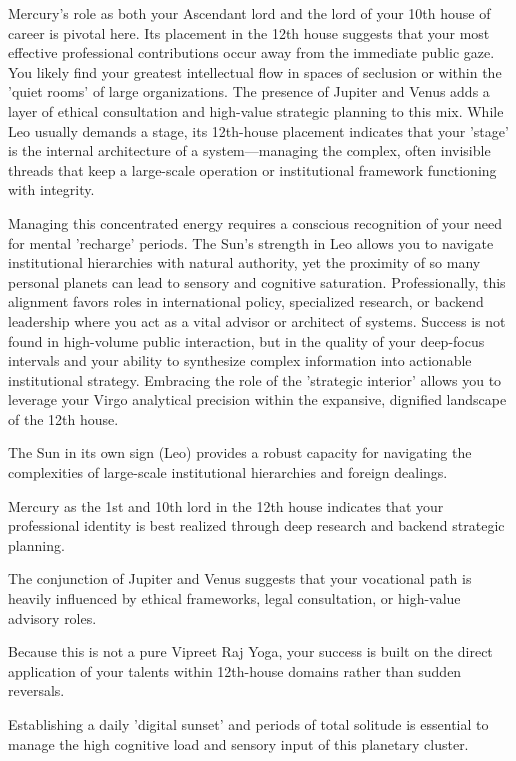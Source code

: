 {\fontsize{9}{13}\selectfont Mercury's role as both your Ascendant lord and the lord of your 10th house of career is pivotal here. Its placement in the 12th house suggests that your most effective professional contributions occur away from the immediate public gaze. You likely find your greatest intellectual flow in spaces of seclusion or within the 'quiet rooms' of large organizations. The presence of Jupiter and Venus adds a layer of ethical consultation and high-value strategic planning to this mix. While Leo usually demands a stage, its 12th-house placement indicates that your 'stage' is the internal architecture of a system---managing the complex, often invisible threads that keep a large-scale operation or institutional framework functioning with integrity.}\par\vspace{1.8mm}

{\fontsize{9}{13}\selectfont Managing this concentrated energy requires a conscious recognition of your need for mental 'recharge' periods. The Sun's strength in Leo allows you to navigate institutional hierarchies with natural authority, yet the proximity of so many personal planets can lead to sensory and cognitive saturation. Professionally, this alignment favors roles in international policy, specialized research, or backend leadership where you act as a vital advisor or architect of systems. Success is not found in high-volume public interaction, but in the quality of your deep-focus intervals and your ability to synthesize complex information into actionable institutional strategy. Embracing the role of the 'strategic interior' allows you to leverage your Virgo analytical precision within the expansive, dignified landscape of the 12th house.}\par\vspace{1.8mm}

\begin{diamondlist}
  \item {\fontsize{8.5}{12}\selectfont The Sun in its own sign (Leo) provides a robust capacity for navigating the complexities of large-scale institutional hierarchies and foreign dealings.}
  \item {\fontsize{8.5}{12}\selectfont Mercury as the 1st and 10th lord in the 12th house indicates that your professional identity is best realized through deep research and backend strategic planning.}
  \item {\fontsize{8.5}{12}\selectfont The conjunction of Jupiter and Venus suggests that your vocational path is heavily influenced by ethical frameworks, legal consultation, or high-value advisory roles.}
  \item {\fontsize{8.5}{12}\selectfont Because this is not a pure Vipreet Raj Yoga, your success is built on the direct application of your talents within 12th-house domains rather than sudden reversals.}
  \item {\fontsize{8.5}{12}\selectfont Establishing a daily 'digital sunset' and periods of total solitude is essential to manage the high cognitive load and sensory input of this planetary cluster.}
\end{diamondlist}

